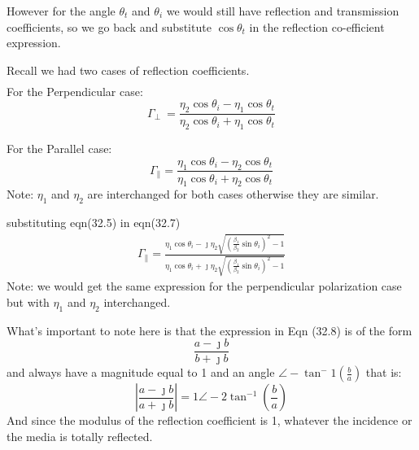 However for the angle $\theta_t$ and $\theta_i$ we would still have reflection and transmission coefficients, so we go back and substitute $\cos\theta_t$ in the reflection co-efficient expression.

Recall we had two cases of reflection coefficients.
\begin{align*}
\end{align*}For the Perpendicular case:
\begin{equation}
\Gamma_\perp\ = \frac{\eta_2\cos\theta_i - \eta_1\cos\theta_t}{\eta_2\cos\theta_i + \eta_1\cos\theta_t}
\end{equation}

For the Parallel case:
\begin{equation}
\Gamma_\parallel = \frac{\eta_1\cos\theta_i - \eta_2\cos\theta_t}{\eta_1\cos\theta_i + \eta_2\cos\theta_t}
\end{equation}
Note: $\eta_1$ and $\eta_2$ are interchanged for both cases otherwise they are similar. 

substituting eqn(32.5) in eqn(32.7)
\begin{align}
\Gamma_\parallel = \frac{\eta_1\cos\theta_i - \jmath\eta_2\sqrt{(\frac{\beta_1}{\beta_2}\sin\theta_i)^2-1}}{\eta_1\cos\theta_i + \jmath\eta_2\sqrt{(\frac{\beta_1}{\beta_2}\sin\theta_i)^2-1}}
\end{align}
Note: we would get the same expression for the perpendicular polarization case but with $\eta_1$ and $\eta_2$ interchanged. 

What's important to note here is that the expression in Eqn (32.8) is of the form
\begin{equation}
\frac{a - \jmath b}{b + \jmath b}
\end{equation}
and always have a magnitude equal  to 1 and an angle $\angle-\tan^-1(\frac{b}{a})$ that is:
\begin{equation}
|\frac{a - \jmath b}{a + \jmath b}| = 1\angle - 2\tan^{-1}(\frac{b}{a})
\end{equation} 
And since the modulus of the reflection coefficient is 1, whatever the incidence or the media is totally reflected.

